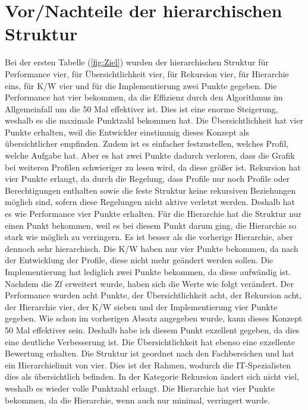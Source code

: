 \section{Vor/Nachteile der hierarchischen Struktur}
\label{sec:chapter05:Hierarchische}
Bei der ersten Tabelle (\ref{fig:Ziel}) wurden der hierarchischen Struktur für Performance vier, für Übersichtlichkeit vier, für Rekursion vier, für Hierarchie eins, für \ac{K/W} vier und für die Implementierung zwei Punkte gegeben.
Die Performance hat vier bekommen, da die Effizienz durch den Algorithmus im Allgemeinfall um die 50 Mal effektiver ist.
Dies ist eine enorme Steigerung, weshalb es die maximale Punktzahl bekommen hat.
Die Übersichtlichkeit hat vier Punkte erhalten, weil die Entwickler einstimmig dieses Konzept als übersichtlicher empfinden.
Zudem ist es einfacher festzustellen, welches Profil, welche Aufgabe hat.
Aber es hat zwei Punkte dadurch verloren, dass die Grafik bei weiteren Profilen schwieriger zu lesen wird, da diese größer ist.
Rekursion hat vier Punkte erlangt, da durch die Regelung, dass Profile nur noch Profile oder Berechtigungen enthalten sowie die feste Struktur keine rekursiven Beziehungen möglich sind, sofern diese Regelungen nicht aktive verletzt werden.
Deshalb hat es wie Performance vier Punkte erhalten.
Für die Hierarchie hat die Struktur nur einen Punkt bekommen, weil es bei diesem Punkt darum ging, die Hierarchie so stark wie möglich zu verringern.
Es ist besser als die vorherige Hierarchie, aber dennoch sehr hierarchisch.
Die \ac{K/W} haben nur vier Punkte bekommen, da nach der Entwicklung der Profile, diese nicht mehr geändert werden sollen.
Die Implementierung hat lediglich zwei Punkte bekommen, da diese aufwändig ist.
\newline
\newline
Nachdem die \ac{Zf} erweitert wurde, haben sich die Werte wie folgt verändert.
Der Performance wurden acht Punkte, der Übersichtlichkeit acht, der Rekursion acht, der Hierarchie vier, der \ac{K/W} sieben und der Implementierung vier Punkte gegeben.
Wie schon im vorherigen Absatz angegeben wurde, kann dieses Konzept 50 Mal effektiver sein.
Deshalb habe ich diesem Punkt exzellent gegeben, da dies eine deutliche Verbesserung ist.
Die Übersichtlichkeit hat ebenso eine exzellente Bewertung erhalten.
Die Struktur ist geordnet nach den Fachbereichen und hat ein Hierarchielimit von vier.
Dies ist der Rahmen, wodurch die IT-Spezialisten dies als übersichtlich befinden.
In der Kategorie Rekursion ändert sich nicht viel, weshalb es wieder volle Punktzahl erlangt.
Die Hierarchie hat vier Punkte bekommen, da die Hierarchie, wenn auch nur minimal, verringert wurde.
